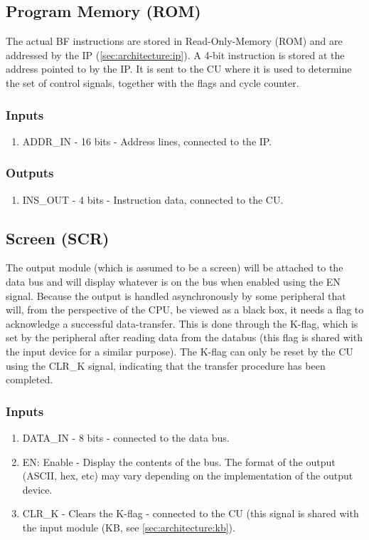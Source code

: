 \subsection{Program Memory (ROM)} \label{sec:architecture:rom}
The actual BF instructions are stored in Read-Only-Memory (ROM) and are addressed by the IP (\ref{sec:architecture:ip}). A 4-bit instruction is stored at the address pointed to by the IP. It is sent to the CU where it is used to determine the set of control signals, together with the flags and cycle counter.

\subsubsection*{Inputs}
\begin{enumerate}
\itemsep0em 
\item ADDR\_IN - 16 bits - Address lines, connected to the IP.
\end{enumerate}

\subsubsection*{Outputs}
\begin{enumerate}
\itemsep0em 
\item INS\_OUT - 4 bits - Instruction data, connected to the CU.
\end{enumerate}


\subsection{Screen (SCR)}  \label{sec:architecture:scr}
The output module (which is assumed to be a screen) will be attached to the data bus and will display whatever is on the bus when enabled using the EN signal. Because the output is handled asynchronously by some peripheral that will, from the perspective of the CPU, be viewed as a black box, it needs a flag to acknowledge a successful data-transfer. This is done through the K-flag, which is set by the peripheral after reading data from the databus (this flag is shared with the input device for a similar purpose). The K-flag can only be reset by the CU using the CLR\_K signal, indicating that the transfer procedure has been completed.
\subsubsection*{Inputs}
\begin{enumerate}
\itemsep0em 
\item DATA\_IN - 8 bits - connected to the data bus.
\item EN: Enable - Display the contents of the bus. The format of the output (ASCII, hex, etc) may vary depending on the implementation of the output device.
\item CLR\_K - Clears the K-flag - connected to the CU (this signal is shared with the input module (KB, see \ref{sec:architecture:kb}).
\end{enumerate}

